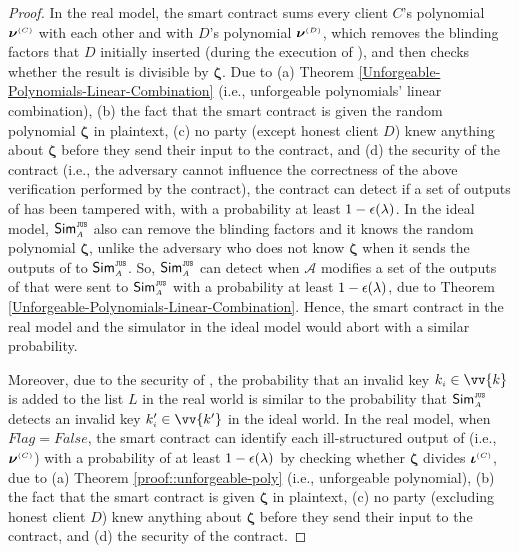 \begin{proof}
In the real model, the smart contract sums every client $C$'s polynomial $\bm\nu^{ \scriptscriptstyle {  {(C)}} }$ with each other and with $D$'s polynomial $\bm\nu^{ \scriptscriptstyle {  {(D)}} }$, which removes the blinding factors that $D$ initially inserted (during the execution of \vopr), and then checks whether the result is divisible by  $\bm \zeta$. Due to (a) Theorem \ref{Unforgeable-Polynomials-Linear-Combination} (i.e., unforgeable polynomials’ linear combination), (b) the fact that the smart contract is given the random polynomial $\bm \zeta$ in plaintext, (c) no party (except honest client $D$) knew anything about $\bm \zeta$ before they send their input to the contract, and (d) the security of the contract (i.e., the adversary cannot influence the correctness of the above verification performed by the contract), the contract can detect if a set of outputs of \vopr has been tampered with, with a probability at least $1-\epsilon(\lambda)$. In the ideal model, $\mathsf{Sim}^{\scriptscriptstyle \mathtt{JUS}}_{\scriptscriptstyle A}$ also can remove the blinding factors and it knows the random polynomial $ {\bm \zeta}$, unlike the adversary who does not know $ {\bm \zeta}$ when it sends the outputs of \vopr to $\mathsf{Sim}^{\scriptscriptstyle \mathtt{JUS}}_{\scriptscriptstyle A}$. So, $\mathsf{Sim}^{\scriptscriptstyle \mathtt{JUS}}_{\scriptscriptstyle A}$ can detect when $\mathcal{A}$ modifies a set of the outputs of \vopr that were sent to  $\mathsf{Sim}^{\scriptscriptstyle \mathtt{JUS}}_{\scriptscriptstyle A}$ with a probability at least $1-\epsilon(\lambda)$,  due to Theorem \ref{Unforgeable-Polynomials-Linear-Combination}. Hence, the smart contract in the real model and the simulator in the ideal model would abort with a similar probability. 

Moreover, due to the security of \zspaa, the probability that an invalid key $k_{\st i}\in \vv{k}$ is added to the list $  L$ in the real world is similar to the probability that  $\mathsf{Sim}^{\scriptscriptstyle \mathtt{JUS}}_{\scriptscriptstyle A}$ detects an invalid key $  k'_{\st i}\in \vv{k'}$ in the ideal world. In the real model, when $Flag=False$, the smart contract can identify each ill-structured output of \vopr (i.e.,  $\bm\nu^{ \scriptscriptstyle {  {(C)}} }$) with a probability of at least $1-\epsilon(\lambda)$ by checking whether $\bm\zeta$  divides $\bm\iota^{ \scriptscriptstyle {  {(C)}}}$, due to  (a) Theorem \ref{proof::unforgeable-poly} (i.e., unforgeable polynomial), (b) the fact that the smart contract is given $\bm \zeta$ in plaintext, (c) no party (excluding honest client $D$) knew anything about $\bm \zeta$ before they send their input to the contract, and (d) the security of the contract. 


\end{proof}
